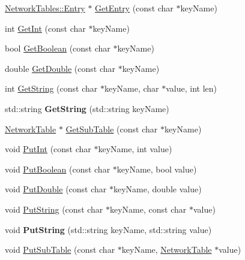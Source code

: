\begin{DoxyCompactItemize}
\item 
\hyperlink{classNetworkTables_1_1Entry}{NetworkTables::Entry} $\ast$ \hyperlink{classNetworkTable_ab1d185782e5ff4e952a3ba971b123e09}{GetEntry} (const char $\ast$keyName)
\item 
int \hyperlink{classNetworkTable_a96fac0b010b3762ca76f9a7266ea4ea8}{GetInt} (const char $\ast$keyName)
\item 
bool \hyperlink{classNetworkTable_a8388a7c761af8aa9df26929a42a1984a}{GetBoolean} (const char $\ast$keyName)
\item 
double \hyperlink{classNetworkTable_a0064df0b72ce042bb51bebbda2b396f4}{GetDouble} (const char $\ast$keyName)
\item 
int \hyperlink{classNetworkTable_a8a165994e25e3fade757779330440c47}{GetString} (const char $\ast$keyName, char $\ast$value, int len)
\item 
\hypertarget{classNetworkTable_aa5aad73483c4393e4af3f5f6a154c679}{
std::string {\bfseries GetString} (std::string keyName)}
\label{classNetworkTable_aa5aad73483c4393e4af3f5f6a154c679}

\item 
\hyperlink{classNetworkTable}{NetworkTable} $\ast$ \hyperlink{classNetworkTable_a990ee7c518e453af4a679d35908e6821}{GetSubTable} (const char $\ast$keyName)
\item 
void \hyperlink{classNetworkTable_a150bef04c2df6d6b4adea7657bc6ec1e}{PutInt} (const char $\ast$keyName, int value)
\item 
void \hyperlink{classNetworkTable_ae5244280852af3478d9902268854c4ae}{PutBoolean} (const char $\ast$keyName, bool value)
\item 
void \hyperlink{classNetworkTable_a0bc059a8f6b65712ecba839e3286789c}{PutDouble} (const char $\ast$keyName, double value)
\item 
void \hyperlink{classNetworkTable_a3a3a0df1a3d71dc87841c2bc0d27afa0}{PutString} (const char $\ast$keyName, const char $\ast$value)
\item 
\hypertarget{classNetworkTable_a2cbadf9a7abea60470bd0202260832b7}{
void {\bfseries PutString} (std::string keyName, std::string value)}
\label{classNetworkTable_a2cbadf9a7abea60470bd0202260832b7}

\item 
void \hyperlink{classNetworkTable_a5a290e9425f7062b8e72a1042f9447fd}{PutSubTable} (const char $\ast$keyName, \hyperlink{classNetworkTable}{NetworkTable} $\ast$value)
\end{DoxyCompactItemize}
